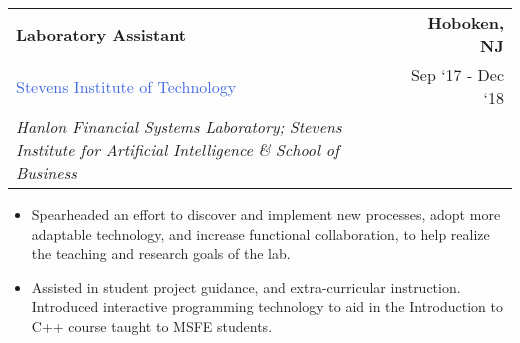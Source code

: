 \documentclass[10pt]{article}
\newcommand{\highlightcolor}{RoyalBlue}
\newcommand{\tabularxwidth}{\textwidth}
\begin{document}
    \begin{minipage}{\tabularxwidth}

        \begin{tabularx}{\tabularxwidth}{X r}
            \textbf{Laboratory Assistant} & \textbf{Hoboken, 
        NJ} \\
            
    
    
    
    

    
        \textcolor{\highlightcolor}{Stevens Institute of Technology} & 
        
    Sep ‘17 - 
    Dec ‘18 \\
        
            \textit{Hanlon Financial Systems Laboratory;}
                \textit{Stevens Institute for Artificial Intelligence} \textit{\&}
                \textit{School of Business} & \\
        
    
            
        \end{tabularx}

        \begin{itemize}[noitemsep, topsep=3pt, parsep=0pt, partopsep=0pt]
            
                \item 
    Spearheaded an effort to discover and implement new processes, adopt more adaptable technology, and increase functional collaboration, to help realize the teaching and research goals of the lab.
            
                \item 
    Assisted in student project guidance, and extra-curricular instruction. Introduced interactive programming technology to aid in the Introduction to C++ course taught to MSFE students.
            

\end{itemize}
\end{minipage}
\end{document}
